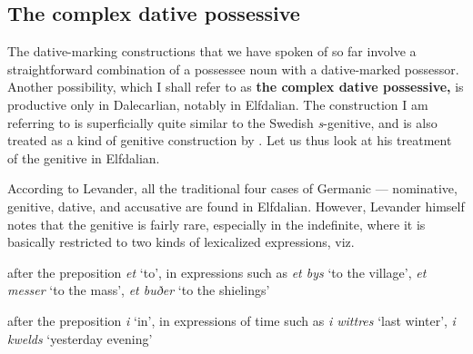 \subsection{\rmfamily The complex dative possessive}
\label{bkm:Ref224373337}
\begin{styleBodyTextFirst}
The dative-marking constructions that we have spoken of so far involve a straightforward combination of a possessee noun with a dative-marked possessor. Another possibility, which I shall refer to as \textbf{the complex dative possessive,} is productive only in Dalecarlian, notably in Elfdalian. The construction I am referring to is superficially quite similar to the Swedish \textit{s}{}-genitive, and is also treated as a kind of genitive construction by \citet{Levander1909}. Let us thus look at his treatment of the genitive in Elfdalian.

\end{styleBodyTextFirst}

\begin{styleBodytextC}
According to Levander, all the traditional four cases of Germanic — nominative, genitive, dative, and accusative are found in Elfdalian. However, Levander himself notes that the genitive is fairly rare, especially in the indefinite, where it is basically restricted to two kinds of lexicalized expressions, viz. 

\end{styleBodytextC}

\begin{listWWNumixleveli}
\item {}

\begin{styleListBulletiii}
after the preposition \textit{et} ‘to’, in expressions such as \textit{et bys} ‘to the village’, \textit{et messer} ‘to the mass’, \textit{et buðer} ‘to the shielings’

\end{styleListBulletiii}

\item {}

\begin{styleListBulletiii}
after the preposition \textit{i} ‘in’, in expressions of time such as \textit{i wittres} ‘last winter’, \textit{i kwelds }‘yesterday evening’

\end{styleListBulletiii}

\end{listWWNumixleveli}

